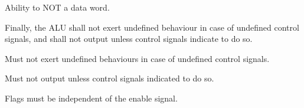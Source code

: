 \begin{feat-requirement}
  Ability to NOT a data word.
\end{feat-requirement}

Finally, the ALU shall not exert undefined behaviour in case of undefined control signals, and shall not output unless control signals indicate to do so. 

\begin{feat-requirement} \label{req:alu-undef-behavior}
  Must not exert undefined behaviours in case of undefined control signals. 
\end{feat-requirement}

\begin{feat-requirement} \label{req:alu-no-output}
  Must not output unless control signals indicated to do so. 
\end{feat-requirement}

\begin{feat-requirement}
  Flags must be independent of the enable signal. 
\end{feat-requirement}
